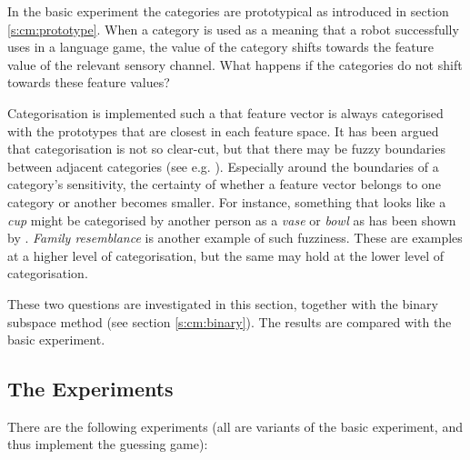 In the basic experiment the categories are prototypical as introduced in section \ref{s:cm:prototype}. When a category is used as a meaning that a robot successfully uses in a language game, the value of the category shifts towards the feature value of the relevant sensory channel. What happens if the categories do not shift towards these feature values?

Categorisation is implemented such a that feature vector is always categorised with the prototypes that are closest in each feature space. It has been argued that categorisation is not so clear-cut, but that there may be fuzzy boundaries between adjacent categories (see e.g. \citep{aitchison:1987,lakoff:1987}). Especially around the boundaries of a category's sensitivity, the certainty of whether a feature vector belongs to one category or another becomes smaller. For instance, something that looks like a {\em cup} might be categorised by another person as a {\em vase} or {\em bowl} as has been shown by \citep{labov:1973}. {\em Family resemblance} \citep{wittgenstein:1958} is another example of such fuzziness.  These are examples at a higher level of categorisation, but the same may hold at the lower level of categorisation.

These two questions are investigated in this section, together with the binary subspace method (see section \ref{s:cm:binary}). The results are compared with the basic experiment.

\subsection{The Experiments}

There are the following experiments (all are variants of the basic experiment, and thus implement the guessing game):

